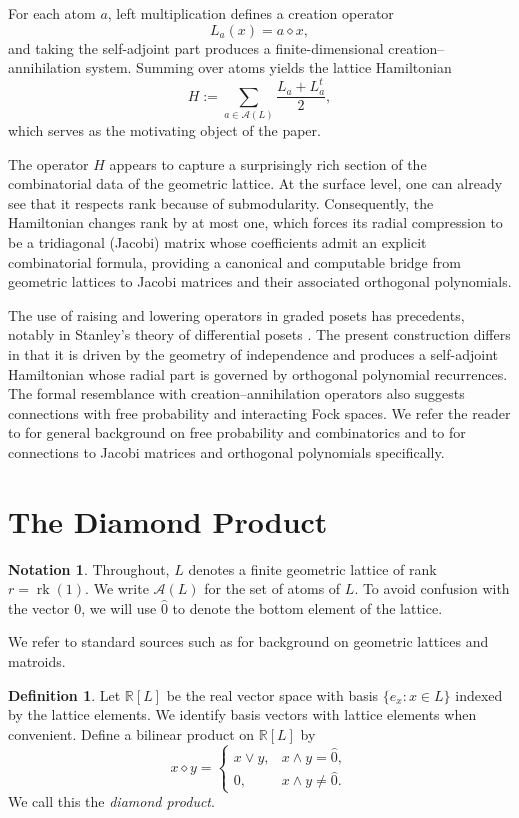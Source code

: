 \documentclass[11pt]{amsart}
\theoremstyle{definition}
\newtheorem{defn}[thm]{Definition}
\newtheorem{notation}[thm]{Notation}
\DeclareMathOperator{\rk}{rk}
\newcommand{\R}{\mathbb{R}}
\newcommand{\At}{\mathcal{A}}
\newcommand{\zero}{\hat{0}}
\newcommand{\one}{{1}}
\begin{document}
For each atom $a$, left multiplication defines a creation operator
\[
L_a(x)=a\diamond x,
\]
and taking the self-adjoint part produces a finite-dimensional creation--annihilation system.  Summing over atoms yields the lattice Hamiltonian
\[
H:=\sum_{a\in \At(L)} \frac{L_a+L_a^t}{2},
\]
which serves as the motivating object of the paper.

The operator $H$ appears to capture a surprisingly rich section of the combinatorial data of the geometric lattice. At the surface level, one can already see that it respects rank because of submodularity. Consequently, the Hamiltonian changes rank by at most one, which forces its radial compression to be a tridiagonal (Jacobi) matrix whose coefficients admit an explicit combinatorial formula, providing a canonical and computable bridge from geometric lattices to Jacobi matrices and their associated orthogonal polynomials.

The use of raising and lowering operators in graded posets has precedents, notably in Stanley's theory of differential posets \cite{Stanley-poset}.  The present construction differs in that it is driven by the geometry of independence and produces a self-adjoint Hamiltonian whose radial part is governed by orthogonal polynomial recurrences.  The formal resemblance with creation–annihilation operators also suggests connections with free probability and interacting Fock spaces. We refer the reader to \cite{NicaSpeicher} for general background on free probability and combinatorics and to \cite{Anshelevich} for connections to Jacobi matrices and orthogonal polynomials specifically.





\section{The Diamond Product}

\begin{notation}
    Throughout, $L$ denotes a finite geometric lattice of rank $r=\rk(\one)$.  We write $\At(L)$ for the set of atoms of $L$. 
    To avoid confusion with the vector $0$, we will use $\hat 0$ to denote the bottom element of the lattice.
\end{notation}

We refer to standard sources such as \cite{Oxley} for background on geometric lattices and matroids.


\begin{defn}
Let $\R[L]$ be the real vector space with basis $\{e_x:x\in L\}$ indexed by the lattice elements.
We identify basis vectors with lattice elements when convenient.  Define a bilinear product on
$\R[L]$ by
\[
x\diamond y=
\begin{cases}
x\vee y,& x\wedge y=\zero,\\
0,& x\wedge y\neq \zero.
\end{cases}
\]
We call this the \emph{diamond product}.
\end{defn}
\end{document}
